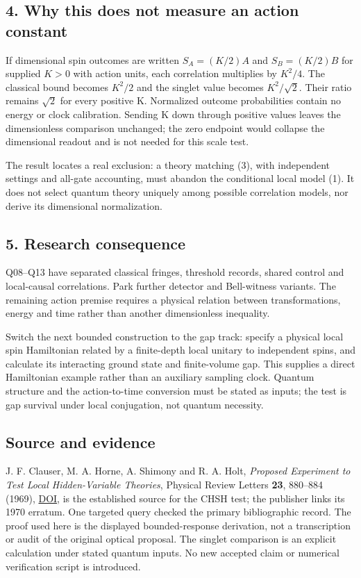 \documentclass[11pt,a4paper]{article}
\begin{document}
\hypertarget{why-this-does-not-measure-an-action-constant}{%
\subsection{4. Why this does not measure an action
constant}\label{why-this-does-not-measure-an-action-constant}}

If dimensional spin outcomes are written \(S_A=(K/2)A\) and
\(S_B=(K/2)B\) for supplied \(K>0\) with action units, each correlation
multiplies by \(K^2/4\). The classical bound becomes \(K^2/2\) and the
singlet value becomes \(K^2/\sqrt2\). Their ratio remains \(\sqrt2\) for
every positive K. Normalized outcome probabilities contain no energy or
clock calibration. Sending K down through positive values leaves the
dimensionless comparison unchanged; the zero endpoint would collapse the
dimensional readout and is not needed for this scale test.

The result locates a real exclusion: a theory matching (3), with
independent settings and all-gate accounting, must abandon the
conditional local model (1). It does not select quantum theory uniquely
among possible correlation models, nor derive its dimensional
normalization.

\hypertarget{research-consequence}{%
\subsection{5. Research consequence}\label{research-consequence}}

Q08--Q13 have separated classical fringes, threshold records, shared
control and local-causal correlations. Park further detector and
Bell-witness variants. The remaining action premise requires a physical
relation between transformations, energy and time rather than another
dimensionless inequality.

Switch the next bounded construction to the gap track: specify a
physical local spin Hamiltonian related by a finite-depth local unitary
to independent spins, and calculate its interacting ground state and
finite-volume gap. This supplies a direct Hamiltonian example rather
than an auxiliary sampling clock. Quantum structure and the
action-to-time conversion must be stated as inputs; the test is gap
survival under local conjugation, not quantum necessity.

\hypertarget{source-and-evidence}{%
\subsection{Source and evidence}\label{source-and-evidence}}

J. F. Clauser, M. A. Horne, A. Shimony and R. A. Holt, \emph{Proposed
Experiment to Test Local Hidden-Variable Theories}, Physical Review
Letters \textbf{23}, 880--884 (1969),
\href{https://doi.org/10.1103/PhysRevLett.23.880}{DOI}, is the
established source for the CHSH test; the publisher links its 1970
erratum. One targeted query checked the primary bibliographic record.
The proof used here is the displayed bounded-response derivation, not a
transcription or audit of the original optical proposal. The singlet
comparison is an explicit calculation under stated quantum inputs. No
new accepted claim or numerical verification script is introduced.
\end{document}
